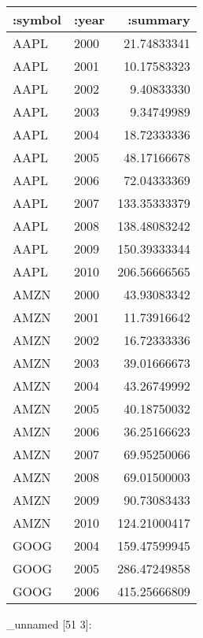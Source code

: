 \documentclass[]{article}
\newenvironment{Shaded}{\begin{snugshade}}{\end{snugshade}}
\newcommand{\KeywordTok}[1]{\textcolor[rgb]{0.13,0.29,0.53}{\textbf{#1}}}
\newcommand{\DecValTok}[1]{\textcolor[rgb]{0.00,0.00,0.81}{#1}}
\newcommand{\VariableTok}[1]{\textcolor[rgb]{0.00,0.00,0.00}{#1}}
\newcommand{\AttributeTok}[1]{\textcolor[rgb]{0.77,0.63,0.00}{#1}}
\newcommand{\NormalTok}[1]{#1}
\begin{document}
\begin{longtable}[]{@{}llr@{}}
\toprule
:symbol & :year & :summary\tabularnewline
\midrule
\endhead
AAPL & 2000 & 21.74833341\tabularnewline
AAPL & 2001 & 10.17583323\tabularnewline
AAPL & 2002 & 9.40833330\tabularnewline
AAPL & 2003 & 9.34749989\tabularnewline
AAPL & 2004 & 18.72333336\tabularnewline
AAPL & 2005 & 48.17166678\tabularnewline
AAPL & 2006 & 72.04333369\tabularnewline
AAPL & 2007 & 133.35333379\tabularnewline
AAPL & 2008 & 138.48083242\tabularnewline
AAPL & 2009 & 150.39333344\tabularnewline
AAPL & 2010 & 206.56666565\tabularnewline
AMZN & 2000 & 43.93083342\tabularnewline
AMZN & 2001 & 11.73916642\tabularnewline
AMZN & 2002 & 16.72333336\tabularnewline
AMZN & 2003 & 39.01666673\tabularnewline
AMZN & 2004 & 43.26749992\tabularnewline
AMZN & 2005 & 40.18750032\tabularnewline
AMZN & 2006 & 36.25166623\tabularnewline
AMZN & 2007 & 69.95250066\tabularnewline
AMZN & 2008 & 69.01500003\tabularnewline
AMZN & 2009 & 90.73083433\tabularnewline
AMZN & 2010 & 124.21000417\tabularnewline
GOOG & 2004 & 159.47599945\tabularnewline
GOOG & 2005 & 286.47249858\tabularnewline
GOOG & 2006 & 415.25666809\tabularnewline
\bottomrule
\end{longtable}

\begin{Shaded}
\end{Shaded}

\_unnamed {[}51 3{]}:
\end{document}
